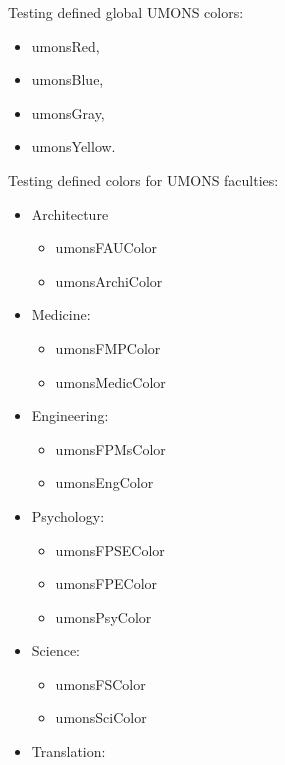 \documentclass{minimal}
\begin{document}
	Testing defined global UMONS colors:
	\begin{itemize}
		\item \textcolor{umonsRed}{umonsRed},
		\item \textcolor{umonsBlue}{umonsBlue},
		\item \textcolor{umonsGray}{umonsGray},
		\item \textcolor{umonsYellow}{umonsYellow}.
	\end{itemize}
	
	Testing defined colors for UMONS faculties:
	\begin{itemize}
		\item Architecture
		\begin{itemize}
			\item \textcolor{umonsFAUColor}{umonsFAUColor}
			\item \textcolor{umonsArchiColor}{umonsArchiColor}
		\end{itemize}
		\item Medicine:
		\begin{itemize}
			\item \textcolor{umonsFMPColor}{umonsFMPColor}
			\item \textcolor{umonsMedicColor}{umonsMedicColor}
		\end{itemize}
		\item Engineering:
		\begin{itemize}
			\item \textcolor{umonsFPMsColor}{umonsFPMsColor}
			\item \textcolor{umonsEngColor}{umonsEngColor}
		\end{itemize}
		\item Psychology:
		\begin{itemize}
			\item \textcolor{umonsFPSEColor}{umonsFPSEColor}
			\item \textcolor{umonsFPEColor}{umonsFPEColor}
			\item \textcolor{umonsPsyColor}{umonsPsyColor}
		\end{itemize}
		\item Science:
		\begin{itemize}
			\item \textcolor{umonsFSColor}{umonsFSColor}
			\item \textcolor{umonsSciColor}{umonsSciColor}
		\end{itemize}
		\item Translation:
		\begin{itemize}

\end{itemize}
\end{itemize}
\end{document}

